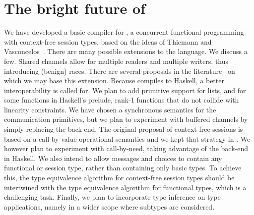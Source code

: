 \section{The bright future of \freest{}}
\label{sec:conclusion}

We have developed a basic compiler for \freest, a concurrent
functional programming with context-free session types, based on the
ideas of Thiemann and Vasconcelos~\cite{DBLP:conf/icfp/ThiemannV16}.
%
There are many possible extensions to the language. We discuss a
few. Shared channels allow for multiple readers and multiple writers,
thus introducing (benign) races. There are several proposals in the
literature~\cite{DBLP:journals/pacmpl/BalzerP17,
  DBLP:conf/sefm/FrancoV13,Lindley.Morris_Lightweight.functional.session.types,DBLP:journals/iandc/Vasconcelos12}
on which we may base this extension.
%
Because \freest{} compiles to Haskell, a better interoperability is
called for. We plan to add primitive support for lists, and for some
functions in Haskell's prelude, rank-1 functions that do not collide
with linearity constraints.
%
We have chosen a synchronous semantics for the communication
primitives, but we plan to experiment with buffered channels by simply
replacing the back-end.
%
The original proposal of context-free sessions is based on a
call-by-value operational semantics and we kept that strategy in
\freest. We however plan to experiment with call-by-need, taking
advantage of the back-end in Haskell. We also intend to allow messages
and choices to contain any functional or session type, rather than
containing only basic types. To achieve this,
the type equivalence algorithm for context-free session 
types should be intertwined with the type equivalence
algorithm for functional types, which is a challenging task.
Finally, we plan to incorporate type inference on type 
applications, namely in a wider scope where subtypes are 
considered.

